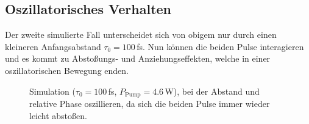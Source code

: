 \documentclass[bachelor,       %
               twoside,        %
               BCOR10mm,       %
               liststotoc,nomtotoc,bibtotoc, %
               english,ngerman, %
               final,          %
               ]{GAUBM}
\begin{document}
\clearpage
\subsection{Oszillatorisches Verhalten}
Der zweite simulierte Fall unterscheidet sich von obigem nur durch einen kleineren Anfangsabstand $\tau_0=100\,$fs.
Nun können die beiden Pulse interagieren und es kommt zu Abstoßungs- und Anziehungseffekten, welche in einer oszillatorischen Bewegung enden.
\begin{figure}[!htb]
   \centering
   \hfill
   \caption{Simulation ($\tau_0=100\,$fs, $P_\text{Pump}=4.6\,$W), bei der Abstand und relative Phase oszillieren, da sich die beiden Pulse immer wieder leicht abstoßen.}
   \label{fig:SimulationOscillation}
\end{figure}
\end{document}
